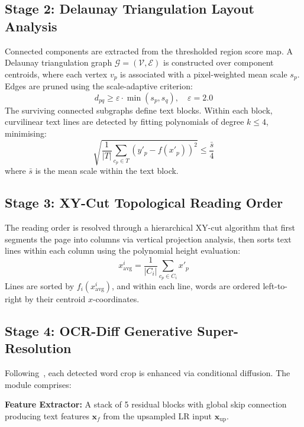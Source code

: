 \documentclass[conference]{IEEEtran}
\begin{document}
\subsection{Stage 2: Delaunay Triangulation Layout Analysis}

Connected components are extracted from the thresholded region score map. A Delaunay triangulation graph $\mathcal{G} = (\mathcal{V}, \mathcal{E})$ is constructed over component centroids, where each vertex $v_p$ is associated with a pixel-weighted mean scale $s_p$. Edges are pruned using the scale-adaptive criterion:
\begin{equation}
    d_{pq} \geq \varepsilon \cdot \min(s_p, s_q), \quad \varepsilon = 2.0
    \label{eq:delaunay}
\end{equation}
The surviving connected subgraphs define text blocks. Within each block, curvilinear text lines are detected by fitting polynomials of degree $k \leq 4$, minimising:
\begin{equation}
    \sqrt{\frac{1}{|T|} \sum_{c_p \in T} \left( y'_p - f(x'_p) \right)^2} \leq \frac{\bar{s}}{4}
    \label{eq:polynomial}
\end{equation}
where $\bar{s}$ is the mean scale within the text block.

\subsection{Stage 3: XY-Cut Topological Reading Order}

The reading order is resolved through a hierarchical XY-cut algorithm that first segments the page into columns via vertical projection analysis, then sorts text lines within each column using the polynomial height evaluation:
\begin{equation}
    x^i_{\text{avg}} = \frac{1}{|C_i|} \sum_{c_p \in C_i} x'_p
\end{equation}
Lines are sorted by $f_i(x^i_{\text{avg}})$, and within each line, words are ordered left-to-right by their centroid $x$-coordinates.

\subsection{Stage 4: OCR-Diff Generative Super-Resolution}

Following~\cite{park2024ocrdiff}, each detected word crop is enhanced via conditional diffusion. The module comprises:

\textbf{Feature Extractor:} A stack of 5 residual blocks with global skip connection producing text features $\mathbf{x}_f$ from the upsampled LR input $\mathbf{x}_{\text{up}}$.
\end{document}
